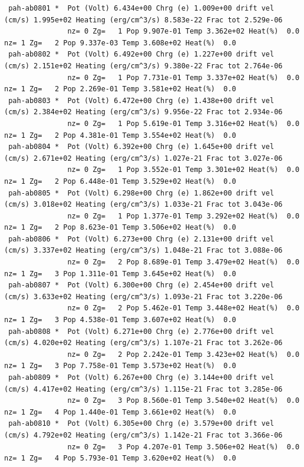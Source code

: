 {\begin{verbatim}
 pah-ab0801 *  Pot (Volt) 6.434e+00 Chrg (e) 1.009e+00 drift vel (cm/s) 1.995e+02 Heating (erg/cm^3/s) 8.583e-22 Frac tot 2.529e-06
               nz= 0 Zg=   1 Pop 9.907e-01 Temp 3.362e+02 Heat(%)  0.0      nz= 1 Zg=   2 Pop 9.337e-03 Temp 3.608e+02 Heat(%)  0.0
 pah-ab0802 *  Pot (Volt) 6.492e+00 Chrg (e) 1.227e+00 drift vel (cm/s) 2.151e+02 Heating (erg/cm^3/s) 9.380e-22 Frac tot 2.764e-06
               nz= 0 Zg=   1 Pop 7.731e-01 Temp 3.337e+02 Heat(%)  0.0      nz= 1 Zg=   2 Pop 2.269e-01 Temp 3.581e+02 Heat(%)  0.0
 pah-ab0803 *  Pot (Volt) 6.472e+00 Chrg (e) 1.438e+00 drift vel (cm/s) 2.384e+02 Heating (erg/cm^3/s) 9.956e-22 Frac tot 2.934e-06
               nz= 0 Zg=   1 Pop 5.619e-01 Temp 3.316e+02 Heat(%)  0.0      nz= 1 Zg=   2 Pop 4.381e-01 Temp 3.554e+02 Heat(%)  0.0
 pah-ab0804 *  Pot (Volt) 6.392e+00 Chrg (e) 1.645e+00 drift vel (cm/s) 2.671e+02 Heating (erg/cm^3/s) 1.027e-21 Frac tot 3.027e-06
               nz= 0 Zg=   1 Pop 3.552e-01 Temp 3.301e+02 Heat(%)  0.0      nz= 1 Zg=   2 Pop 6.448e-01 Temp 3.529e+02 Heat(%)  0.0
 pah-ab0805 *  Pot (Volt) 6.298e+00 Chrg (e) 1.862e+00 drift vel (cm/s) 3.018e+02 Heating (erg/cm^3/s) 1.033e-21 Frac tot 3.043e-06
               nz= 0 Zg=   1 Pop 1.377e-01 Temp 3.292e+02 Heat(%)  0.0      nz= 1 Zg=   2 Pop 8.623e-01 Temp 3.506e+02 Heat(%)  0.0
 pah-ab0806 *  Pot (Volt) 6.273e+00 Chrg (e) 2.131e+00 drift vel (cm/s) 3.337e+02 Heating (erg/cm^3/s) 1.048e-21 Frac tot 3.088e-06
               nz= 0 Zg=   2 Pop 8.689e-01 Temp 3.479e+02 Heat(%)  0.0      nz= 1 Zg=   3 Pop 1.311e-01 Temp 3.645e+02 Heat(%)  0.0
 pah-ab0807 *  Pot (Volt) 6.300e+00 Chrg (e) 2.454e+00 drift vel (cm/s) 3.633e+02 Heating (erg/cm^3/s) 1.093e-21 Frac tot 3.220e-06
               nz= 0 Zg=   2 Pop 5.462e-01 Temp 3.448e+02 Heat(%)  0.0      nz= 1 Zg=   3 Pop 4.538e-01 Temp 3.607e+02 Heat(%)  0.0
 pah-ab0808 *  Pot (Volt) 6.271e+00 Chrg (e) 2.776e+00 drift vel (cm/s) 4.020e+02 Heating (erg/cm^3/s) 1.107e-21 Frac tot 3.262e-06
               nz= 0 Zg=   2 Pop 2.242e-01 Temp 3.423e+02 Heat(%)  0.0      nz= 1 Zg=   3 Pop 7.758e-01 Temp 3.573e+02 Heat(%)  0.0
 pah-ab0809 *  Pot (Volt) 6.267e+00 Chrg (e) 3.144e+00 drift vel (cm/s) 4.417e+02 Heating (erg/cm^3/s) 1.115e-21 Frac tot 3.285e-06
               nz= 0 Zg=   3 Pop 8.560e-01 Temp 3.540e+02 Heat(%)  0.0      nz= 1 Zg=   4 Pop 1.440e-01 Temp 3.661e+02 Heat(%)  0.0
 pah-ab0810 *  Pot (Volt) 6.305e+00 Chrg (e) 3.579e+00 drift vel (cm/s) 4.792e+02 Heating (erg/cm^3/s) 1.142e-21 Frac tot 3.366e-06
               nz= 0 Zg=   3 Pop 4.207e-01 Temp 3.506e+02 Heat(%)  0.0      nz= 1 Zg=   4 Pop 5.793e-01 Temp 3.620e+02 Heat(%)  0.0
\end{verbatim}
}

